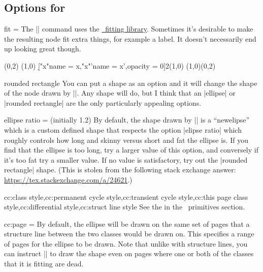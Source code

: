 \begin{sseqdata}[name = basic, cohomological Serre grading]
\subsection{Options for \sectionstring\circleclass}
\begin{key}{fit = }
The |\circleclasses| command uses the \href{\pgfmanualurl#section.52}{\tikzpkg\  fitting library}. Sometimes it's desirable to make the resulting node fit extra things, for example a label. It doesn't necessarily end up looking great though.
\begin{codeexample}[]
\begin{sseqpage}[Adams grading,axes gap = 0.7cm]
\class(0,2)
\class(1,0)
\d["x"{name = x},"x"'{name = x',opacity = 0}]2(1,0)
\circleclasses[fit = (x)(x'),rounded rectangle](1,0)(0,2)
\end{sseqpage}
\end{codeexample}
\end{key}

\begin{key}{rounded rectangle}
You can put a shape as an option and it will change the shape of the node drawn by |\circleclasses|. Any shape will do, but I think that an |ellipse| or |rounded rectangle| are the only particularly appealing options.
\end{key}

\begin{key}{ellipse ratio =  (initially 1.2)}
By default, the shape drawn by |\circleclasses| is a ``newelipse'' which is a custom defined shape that respects the option |elipse ratio| which roughly controls how long and skinny versus short and fat the ellipse is. If you find that the ellipse is too long, try a larger value of this option, and conversely if it's too fat try a smaller value. If no value is satisfactory, try out the |rounded rectangle| shape. (This is stolen from the following stack exchange answer: \url{https://tex.stackexchange.com/a/24621}.)
\end{key}

\begin{keylist}{cc:class style,cc:permanent cycle style,cc:transient cycle style,cc:this page class style,cc:differential style,cc:struct line style}
See the  in the \tikzpkg\  primitives section.
\end{keylist}

\begin{key}{cc:page = }
By default, the ellipse will be drawn on the same set of pages that a structure line between the two classes would be drawn on. This specifies a range of pages for the ellipse to be drawn. Note that unlike with structure lines, you can instruct |\circleclasses| to draw the shape even on pages where one or both of the classes that it is fitting are dead.
\end{key}


\end{sseqdata}
